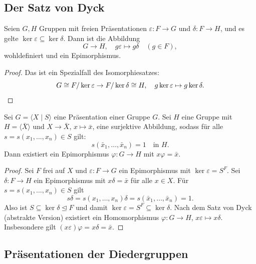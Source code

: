 \documentclass[11pt]{article}
\begin{document}
\subsection{Der Satz von Dyck}

\begin{theorem}\Theorem
  Seien $G, H$ Gruppen mit freien Präsentationen $\varepsilon\colon F \to G$ und $\delta\colon F \to H$, und es gelte $\ker\varepsilon \subseteq \ker\delta$. Dann ist die Abbildung
  \[ G \to H, \quad g\varepsilon \mapsto g\delta \quad (g \in F), \]
  wohldefiniert und ein Epimorphismus.
\end{theorem}

\begin{proof}
  Das ist ein Spezialfall des Isomorphiesatzes:
  \[ G \cong F/\ker\varepsilon \to F/\ker\delta \cong H, \quad g\ker\varepsilon \mapsto g\ker\delta. \qedhere \]
\end{proof}

\begin{theorem}\Theorem
  Sei $G = \langle X \mid S \rangle$ eine Präsentation einer Gruppe $G$. Sei $H$ eine Gruppe mit $H = \langle \bar{X} \rangle$ und $X \to \bar{X}$, $x \mapsto \bar{x}$, eine surjektive Abbildung, sodass für alle $s = s(x_1, \dots, x_n) \in S$ gilt:
  \[ s(\bar{x}_1, \dots, \bar{x}_n) = 1 \quad \text{in } H. \]
  Dann existiert ein Epimorphismus $\varphi\colon G \to H$ mit $x\varphi = \bar{x}$.
\end{theorem}


\begin{proof}
  Sei $F$ frei auf $X$ und $\varepsilon\colon F \to G$ ein Epimorphismus mit $\ker\varepsilon = S^F$. Sei $\delta\colon F \to H$ ein Epimorphismus mit $x\delta = \bar{x}$ für alle $x \in X$. Für $s = s(x_1, \dots, x_n) \in S$ gilt
  \[ s\delta = s(x_1, \dots, x_n)\delta = s(\bar{x}_1, \dots, \bar{x}_n) = 1. \]
  Also ist $S \subseteq \ker\delta \trianglelefteq F$ und damit $\ker\varepsilon = S^F \subseteq \ker\delta$.
  Nach dem Satz von Dyck (abstrakte Version) existiert ein Homomorphismus $\varphi\colon G \to H$, $x\varepsilon \mapsto x\delta$. Insbesondere gilt $(x\varepsilon)\varphi = x\delta = \bar{x}$.
\end{proof}


\subsection{Präsentationen der Diedergruppen}
\end{document}
